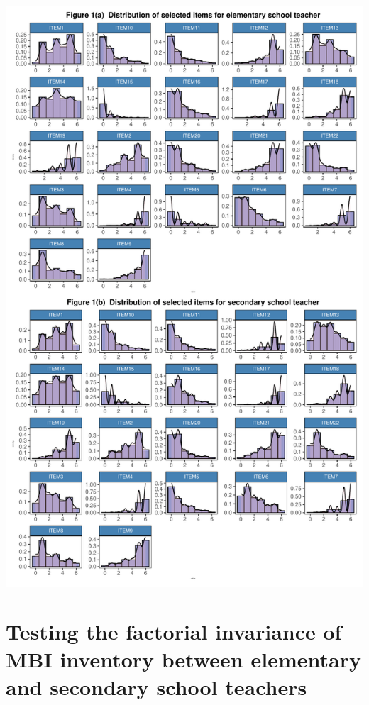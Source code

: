 \documentclass[
]{article}
\begin{document}
\begin{center}\includegraphics{Assignment5_RongGuang_files/figure-latex/unnamed-chunk-13-1} \end{center}

\hypertarget{testing-the-factorial-invariance-of-mbi-inventory-between-elementary-and-secondary-school-teachers}{%
\section{Testing the factorial invariance of MBI inventory between elementary and secondary school teachers}\label{testing-the-factorial-invariance-of-mbi-inventory-between-elementary-and-secondary-school-teachers}}
\end{document}
